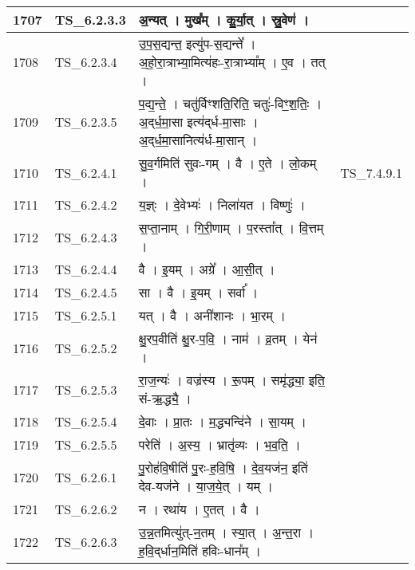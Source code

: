 \documentclass[17pt]{extarticle}
\begin{document}
\begin{longtable}{||p{0.4in}||p{0.9in}||p{4.0in}||p{0.9in}||}
        \hline
            1707 & TS\_6.2.3.3 & अ॒न्यत्   ।   मुख᳚म्   ।   कु॒र्या॒त्   ।   स्रु॒वेण॑   ।    &      \\
        \hline
            1708 & TS\_6.2.3.4 & उ॒प॒स॒द्यन्त॒ इत्यु॑प{-}स॒द्यन्ते᳚   ।   अ॒हो॒रा॒त्राभ्या॒मित्य॑हः{-}रा॒त्राभ्या᳚म्   ।   ए॒व   ।   तत्   ।    &      \\
        \hline
            1709 & TS\_6.2.3.5 & प॒द्य॒न्ते॒   ।   चतु॑र्विꣳशति॒रिति॒ चतुः॑{-}विꣳ॒॒श॒तिः॒   ।   अ॒द्‌र्ध॒मा॒सा इत्य॑द्‌र्ध{-}मा॒साः   ।   अ॒द्‌र्ध॒मा॒सानित्य॑र्ध{-}मा॒सान्   ।    &      \\
        \hline
            1710 & TS\_6.2.4.1 & सु॒व॒र्गमिति॑ सुवः{-}गम्   ।   वै   ।   ए॒ते   ।   लो॒कम्   ।    &  TS\_7.4.9.1       \\
        \hline
            1711 & TS\_6.2.4.2 & य॒ज्ञ्ः   ।   दे॒वेभ्यः॑   ।   निला॑यत   ।   विष्णुः॑   ।    &      \\
        \hline
            1712 & TS\_6.2.4.3 & स॒प्ता॒नाम्   ।   गि॒री॒णाम्   ।   प॒रस्ता᳚त्   ।   वि॒त्तम्   ।    &      \\
        \hline
            1713 & TS\_6.2.4.4 & वै   ।   इ॒यम्   ।   अग्रे᳚   ।   आ॒सी॒त्   ।    &      \\
        \hline
            1714 & TS\_6.2.4.5 & सा   ।   वै   ।   इ॒यम्   ।   सर्वा᳚   ।    &      \\
        \hline
            1715 & TS\_6.2.5.1 & यत्   ।   वै   ।   अनी॑शानः   ।   भा॒रम्   ।    &      \\
        \hline
            1716 & TS\_6.2.5.2 & क्षु॒रप॒वीति॑ क्षु॒र{-}प॒वि॒   ।   नाम॑   ।   व्र॒तम्   ।   येन॑   ।    &      \\
        \hline
            1717 & TS\_6.2.5.3 & रा॒ज॒न्यः॑   ।   वज्र॑स्य   ।   रू॒पम्   ।   समृ॑द्ध्या॒ इति॒ सं{-}ऋ॒द्ध्यै॒   ।    &      \\
        \hline
            1718 & TS\_6.2.5.4 & दे॒वाः   ।   प्रा॒तः   ।   म॒द्ध्यन्दि॑ने   ।   सा॒यम्   ।    &      \\
        \hline
            1719 & TS\_6.2.5.5 & परेति॑   ।   अ॒स्य॒   ।   भ्रातृ॑व्यः   ।   भ॒व॒ति॒   ।    &      \\
        \hline
            1720 & TS\_6.2.6.1 & पु॒रोह॑वि॒षीति॑ पु॒रः{-}ह॒वि॒षि॒   ।   दे॒व॒यज॑न॒ इति॑ देव{-}यज॑ने   ।   या॒ज॒ये॒त्   ।   यम्   ।    &      \\
        \hline
            1721 & TS\_6.2.6.2 & न   ।   रथा॑य   ।   ए॒तत्   ।   वै   ।    &      \\
        \hline
            1722 & TS\_6.2.6.3 & उ॒न्न॒तमित्यु॑त्{-}न॒तम्   ।   स्या॒त्   ।   अ॒न्त॒रा   ।   ह॒वि॒द्‌र्धान॒मिति॑ हविः{-}धान᳚म्   ।    &      \\

\end{longtable}
\end{document}
